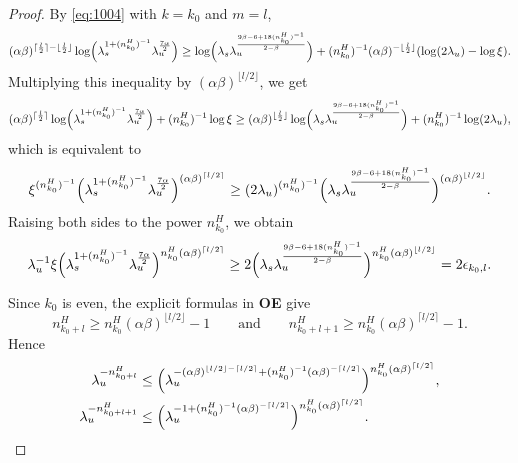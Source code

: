 \documentclass{amsart}
\theoremstyle{plain}
\theoremstyle{definition}
\theoremstyle{remark}
\numberwithin{equation}{section}
\begin{document}
\begin{proof}
By \eqref{eq:1004} with $k=k_0$ and $m=l$,
\[
(\alpha\beta)^{\lceil\frac{l}{2}\rceil-\lfloor\frac{l}{2}\rfloor}
\log\Bigl(\lambda_s^{1+(n_{k_0}^H)^{-1}}\lambda_u^{\frac{7\alpha}{2}}\Bigr)
\ge
\log\Bigl(\lambda_s\lambda_u^{\frac{9\beta-6+18(n_{k_0}^H)^{-1}}{2-\beta}}\Bigr)
+(n_{k_0}^H)^{-1}(\alpha\beta)^{-\lfloor\frac{l}{2}\rfloor}
(\log(2\lambda_u)-\log\xi).
\]
Multiplying this inequality by $(\alpha\beta)^{\lfloor l/2\rfloor}$, we get
\[
(\alpha\beta)^{\lceil\frac{l}{2}\rceil}
\log\Bigl(\lambda_s^{1+(n_{k_0}^H)^{-1}}\lambda_u^{\frac{7\alpha}{2}}\Bigr)
+(n_{k_0}^H)^{-1}\log\xi
\ge
(\alpha\beta)^{\lfloor\frac{l}{2}\rfloor}
\log\Bigl(\lambda_s\lambda_u^{\frac{9\beta-6+18(n_{k_0}^H)^{-1}}{2-\beta}}\Bigr)
+(n_{k_0}^H)^{-1}\log(2\lambda_u),
\]
which is equivalent to
\[
\xi^{(n_{k_0}^H)^{-1}}
\Bigl(\lambda_s^{1+(n_{k_0}^H)^{-1}}\lambda_u^{\frac{7\alpha}{2}}\Bigr)^{(\alpha\beta)^{\lceil l/2\rceil}}
\ge
(2\lambda_u)^{(n_{k_0}^H)^{-1}}
\Bigl(\lambda_s\lambda_u^{\frac{9\beta-6+18(n_{k_0}^H)^{-1}}{2-\beta}}\Bigr)^{(\alpha\beta)^{\lfloor l/2\rfloor}}.
\]
Raising both sides to the power $n_{k_0}^H$, we obtain
\begin{equation}\label{eq:lem53step1}
\lambda_u^{-1}\xi
\Bigl(\lambda_s^{1+(n_{k_0}^H)^{-1}}\lambda_u^{\frac{7\alpha}{2}}\Bigr)^{n_{k_0}^H(\alpha\beta)^{\lceil l/2\rceil}}
\ge
2\Bigl(\lambda_s\lambda_u^{\frac{9\beta-6+18(n_{k_0}^H)^{-1}}{2-\beta}}\Bigr)^{n_{k_0}^H(\alpha\beta)^{\lfloor l/2\rfloor}}
=
2\epsilon_{k_0,l}.
\end{equation}

Since $k_0$ is even, the explicit formulas in {\bf OE} give
\[
n_{k_0+l}^H\ge n_{k_0}^H(\alpha\beta)^{\lfloor l/2\rfloor}-1
\qquad\text{and}\qquad
n_{k_0+l+1}^H\ge n_{k_0}^H(\alpha\beta)^{\lceil l/2\rceil}-1.
\]
Hence
\begin{equation}\label{eq:lem53step2}
\begin{split}
\lambda_u^{-n_{k_0+l}^H}
&\le
\Bigl(
\lambda_u^{-(\alpha\beta)^{\lfloor l/2\rfloor-\lceil l/2\rceil}
+(n_{k_0}^H)^{-1}(\alpha\beta)^{-\lceil l/2\rceil}}
\Bigr)^{n_{k_0}^H(\alpha\beta)^{\lceil l/2\rceil}},\\
\lambda_u^{-n_{k_0+l+1}^H}
&\le
\Bigl(
\lambda_u^{-1+(n_{k_0}^H)^{-1}(\alpha\beta)^{-\lceil l/2\rceil}}
\Bigr)^{n_{k_0}^H(\alpha\beta)^{\lceil l/2\rceil}}.
\end{split}
\end{equation}


\end{proof}
\end{document}
